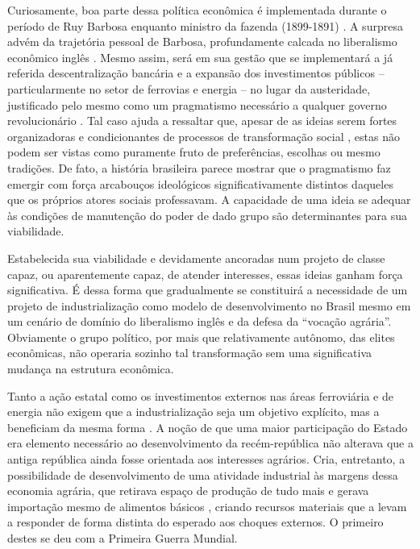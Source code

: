Curiosamente, boa parte dessa política econômica é implementada durante
o período de Ruy Barbosa enquanto ministro da fazenda (1899-1891)
\cite{salomao_os_2021}. A surpresa advém da trajetória pessoal de Barbosa,
profundamente calcada no liberalismo econômico inglês \cite{salomao_os_2021}. Mesmo
assim, será em sua gestão que se implementará a já referida
descentralização bancária e a expansão dos investimentos públicos --
particularmente no setor de ferrovias e energia -- no lugar da
austeridade, justificado pelo mesmo como um pragmatismo necessário a
qualquer governo revolucionário \cite{salomao_os_2021}. Tal caso ajuda a ressaltar que,
apesar de as ideias serem fortes organizadoras e condicionantes de
processos de transformação social \citep{perissinotto_ideias_2023}, estas não podem ser
vistas como puramente fruto de preferências, escolhas ou mesmo
tradições. De fato, a história brasileira parece mostrar que o
pragmatismo faz emergir com força arcabouços ideológicos
significativamente distintos daqueles que os próprios atores sociais
professavam. A capacidade de uma ideia se adequar às condições de
manutenção do poder de dado grupo são determinantes para sua
viabilidade.


Estabelecida sua viabilidade e devidamente ancoradas num projeto de
classe capaz, ou aparentemente capaz, de atender interesses, essas
ideias ganham força significativa. É dessa forma que gradualmente se
constituirá a necessidade de um projeto de industrialização como modelo
de desenvolvimento no Brasil mesmo em um cenário de domínio do
liberalismo inglês e da defesa da ``vocação agrária''. Obviamente o
grupo político, por mais que relativamente autônomo, das elites
econômicas, não operaria sozinho tal transformação sem uma significativa
mudança na estrutura econômica.

Tanto a ação estatal como os investimentos externos nas áreas
ferroviária e de energia não exigem que a industrialização seja um
objetivo explícito, mas a beneficiam da mesma forma
\citep{suzigan2000}. A
noção de que uma maior participação do Estado era elemento necessário ao
desenvolvimento da recém-república não alterava que a antiga república
ainda fosse orientada aos interesses agrários. Cria, entretanto, a
possibilidade de desenvolvimento de uma atividade industrial às margens
dessa economia agrária, que retirava espaço de produção de tudo mais e
gerava importação mesmo de alimentos básicos
\citep{pradojunior2012},
criando recursos materiais que a levam a responder de forma distinta do
esperado aos choques externos. O primeiro destes se deu com a Primeira Guerra Mundial.

